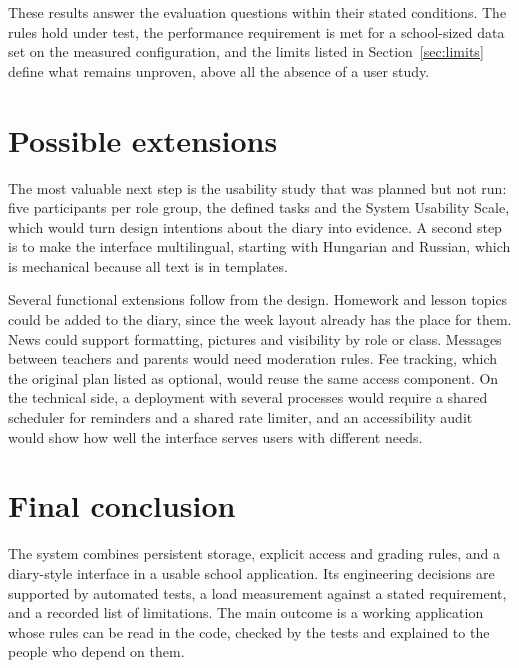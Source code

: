 These results answer the evaluation questions within their stated conditions. The rules hold under test, the performance requirement is met for a school-sized data set on the measured configuration, and the limits listed in Section~\ref{sec:limits} define what remains unproven, above all the absence of a user study.

\section{Possible extensions}

The most valuable next step is the usability study that was planned but not run: five participants per role group, the defined tasks and the System Usability Scale, which would turn design intentions about the diary into evidence. A second step is to make the interface multilingual, starting with Hungarian and Russian, which is mechanical because all text is in templates.

Several functional extensions follow from the design. Homework and lesson topics could be added to the diary, since the week layout already has the place for them. News could support formatting, pictures and visibility by role or class. Messages between teachers and parents would need moderation rules. Fee tracking, which the original plan listed as optional, would reuse the same access component. On the technical side, a deployment with several processes would require a shared scheduler for reminders and a shared rate limiter, and an accessibility audit would show how well the interface serves users with different needs.

\section{Final conclusion}

The system combines persistent storage, explicit access and grading rules, and a diary-style interface in a usable school application. Its engineering decisions are supported by automated tests, a load measurement against a stated requirement, and a recorded list of limitations. The main outcome is a working application whose rules can be read in the code, checked by the tests and explained to the people who depend on them.
